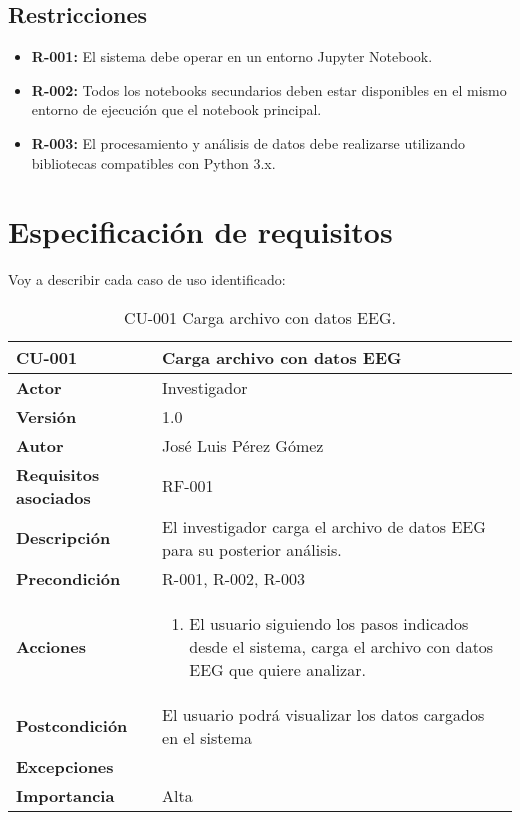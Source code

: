 \subsection{Restricciones}

\begin{itemize}
\tightlist
\item
  \textbf{R-001:} El sistema debe operar en un entorno Jupyter Notebook.
 
\item
  \textbf{R-002:} Todos los notebooks secundarios deben estar disponibles en el mismo entorno de ejecución que el notebook principal.

\item
  \textbf{R-003:} El procesamiento y análisis de datos debe realizarse utilizando bibliotecas compatibles con Python 3.x.

\end{itemize}




\section{Especificación de requisitos}

Voy a describir cada caso de uso identificado:


\begin{table}[p]
	\centering
	\begin{tabularx}{\linewidth}{ p{} p{} }
		\toprule
		\textbf{CU-001}    & \textbf{Carga archivo con datos EEG}\\
		\toprule		
		\textbf{Actor}              & Investigador    \\ 
		\textbf{Versión}              & 1.0    \\
		\textbf{Autor}                & José Luis Pérez Gómez \\
		\textbf{Requisitos asociados} & RF-001 \\
		\textbf{Descripción}          & El investigador carga el archivo de datos EEG para su posterior análisis. \\
		\textbf{Precondición}         & R-001, R-002, R-003\\
		\textbf{Acciones}             &
		\begin{enumerate}
			\def\labelenumi{\arabic{enumi}.}
			\tightlist
			\item El usuario siguiendo los pasos indicados desde el sistema, carga el archivo con datos EEG que quiere analizar.

		\end{enumerate}\\
		\textbf{Postcondición}        & El usuario podrá visualizar los datos cargados en el sistema\\
		\textbf{Excepciones}          &  \\
		\textbf{Importancia}          & Alta \\
		\bottomrule
	\end{tabularx}
	\caption{CU-001 Carga archivo con datos EEG.}
\end{table}



